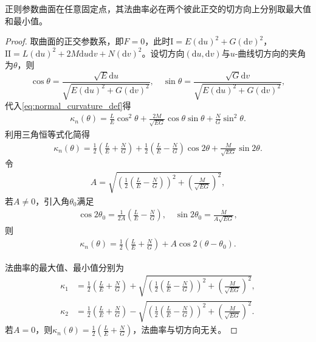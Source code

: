 \documentclass[../../main.tex]{subfiles}%
\begin{document}
\begin{theorem}
正则参数曲面在任意固定点，其法曲率必在两个彼此正交的切方向上分别取最大值和最小值。
\end{theorem}
\begin{proof}

取曲面的正交参数系，即$F=0$，此时$\mathrm{I}=E(\mathrm{d}u)^2+G(\mathrm{d}v)^2$，$\mathrm{II}=L(\mathrm{d}u)^2+2M\mathrm{d}u\mathrm{d}v+N(\mathrm{d}v)^2$。设切方向$(\mathrm{d}u,\mathrm{d}v)$与$u$-曲线切方向的夹角为$\theta$，则
$$\cos\theta=\frac{\sqrt{E}\mathrm{d}u}{\sqrt{E(\mathrm{d}u)^2+G(\mathrm{d}v)^2}},\quad \sin\theta=\frac{\sqrt{G}\mathrm{d}v}{\sqrt{E(\mathrm{d}u)^2+G(\mathrm{d}v)^2}},$$
代入\eqref{eq:normal_curvature_def}得
\begin{align*}
\kappa_n(\theta)=\frac{L}{E}\cos^2\theta+\frac{2M}{\sqrt{EG}}\cos\theta\sin\theta+\frac{N}{G}\sin^2\theta.
\end{align*}
利用三角恒等式化简得
\begin{align*}
\kappa_n(\theta)=\frac{1}{2}\left(\frac{L}{E}+\frac{N}{G}\right)+\frac{1}{2}\left(\frac{L}{E}-\frac{N}{G}\right)\cos2\theta+\frac{M}{\sqrt{EG}}\sin2\theta.
\end{align*}
令
\begin{align}
A=\sqrt{\left(\frac{1}{2}\left(\frac{L}{E}-\frac{N}{G}\right)\right)^2+\left(\frac{M}{\sqrt{EG}}\right)^2},\label{eq:A_def}
\end{align}
若$A\neq0$，引入角$\theta_0$满足
\begin{align}
\cos2\theta_0=\frac{1}{2A}\left(\frac{L}{E}-\frac{N}{G}\right),\quad \sin2\theta_0=\frac{M}{A\sqrt{EG}},\label{eq:theta0_def}
\end{align}
则
\begin{align*}
\kappa_n(\theta)=\frac{1}{2}\left(\frac{L}{E}+\frac{N}{G}\right)+A\cos2(\theta-\theta_0).
\end{align*}

法曲率的最大值、最小值分别为
\begin{align}
\kappa_1&=\frac{1}{2}\left(\frac{L}{E}+\frac{N}{G}\right)+\sqrt{\left(\frac{1}{2}\left(\frac{L}{E}-\frac{N}{G}\right)\right)^2+\left(\frac{M}{\sqrt{EG}}\right)^2},\label{eq:max_principal_curvature}\\
\kappa_2&=\frac{1}{2}\left(\frac{L}{E}+\frac{N}{G}\right)-\sqrt{\left(\frac{1}{2}\left(\frac{L}{E}-\frac{N}{G}\right)\right)^2+\left(\frac{M}{\sqrt{EG}}\right)^2}.\label{eq:min_principal_curvature}
\end{align}
若$A=0$，则$\kappa_n(\theta)=\frac{1}{2}\left(\frac{L}{E}+\frac{N}{G}\right)$，法曲率与切方向无关。
\end{proof}
\end{document}
